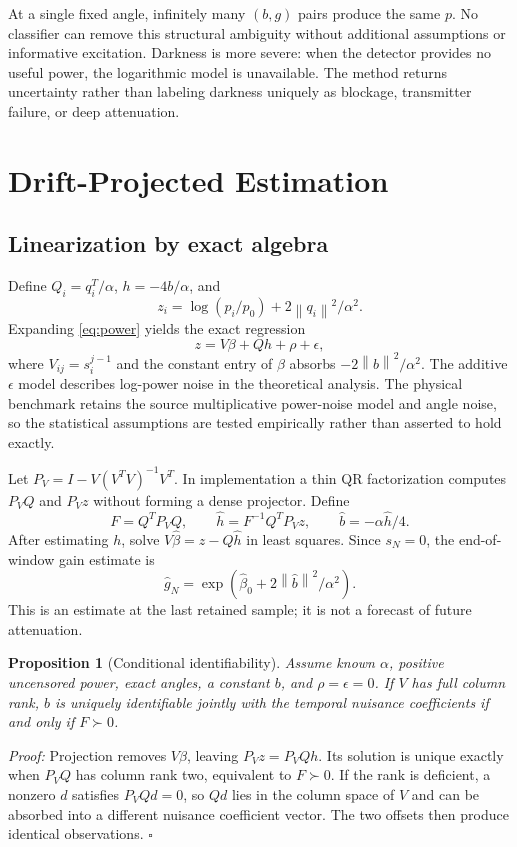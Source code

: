 \documentclass[journal]{IEEEtran}
\newtheorem{proposition}{Proposition}
\newcommand{\norm}[1]{\left\lVert#1\right\rVert}
\begin{document}
At a single fixed angle, infinitely many $(b,g)$ pairs produce the same $p$. No classifier can remove this structural ambiguity without additional assumptions or informative excitation. Darkness is more severe: when the detector provides no useful power, the logarithmic model is unavailable. The method returns uncertainty rather than labeling darkness uniquely as blockage, transmitter failure, or deep attenuation.

\section{Drift-Projected Estimation}
\subsection{Linearization by exact algebra}
Define $Q_i=q_i^T/\alpha$, $h=-4b/\alpha$, and
\begin{equation}
 z_i=\log(p_i/p_0)+2\norm{q_i}^2/\alpha^2.
\end{equation}
Expanding \eqref{eq:power} yields the exact regression
\begin{equation}
 z=V\beta+Qh+\rho+\epsilon,
 \label{eq:regression}
\end{equation}
where $V_{ij}=s_i^{j-1}$ and the constant entry of $\beta$ absorbs $-2\norm b^2/\alpha^2$. The additive $\epsilon$ model describes log-power noise in the theoretical analysis. The physical benchmark retains the source multiplicative power-noise model and angle noise, so the statistical assumptions are tested empirically rather than asserted to hold exactly.

Let $P_V=I-V(V^TV)^{-1}V^T$. In implementation a thin QR factorization computes $P_VQ$ and $P_Vz$ without forming a dense projector. Define
\begin{equation}
 F=Q^TP_VQ,\qquad
 \widehat h=F^{-1}Q^TP_Vz,\qquad
 \widehat b=-\alpha\widehat h/4.
 \label{eq:estimate}
\end{equation}
After estimating $h$, solve $V\widehat\beta=z-Q\widehat h$ in least squares. Since $s_N=0$, the end-of-window gain estimate is
\begin{equation}
 \widehat g_N=\exp(\widehat\beta_0+2\norm{\widehat b}^2/\alpha^2).
\end{equation}
This is an estimate at the last retained sample; it is not a forecast of future attenuation.

\begin{proposition}[Conditional identifiability]
Assume known $\alpha$, positive uncensored power, exact angles, a constant $b$, and $\rho=\epsilon=0$. If $V$ has full column rank, $b$ is uniquely identifiable jointly with the temporal nuisance coefficients if and only if $F\succ0$.
\end{proposition}
\emph{Proof:} Projection removes $V\beta$, leaving $P_Vz=P_VQh$. Its solution is unique exactly when $P_VQ$ has column rank two, equivalent to $F\succ0$. If the rank is deficient, a nonzero $d$ satisfies $P_VQd=0$, so $Qd$ lies in the column space of $V$ and can be absorbed into a different nuisance coefficient vector. The two offsets then produce identical observations. $\square$
\end{document}
